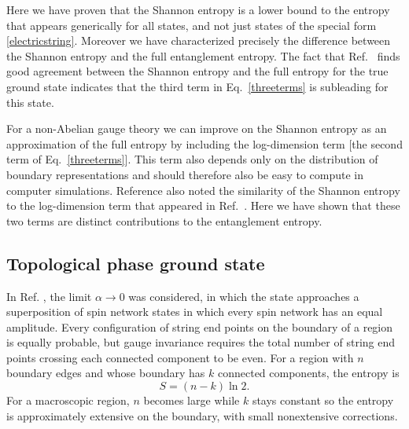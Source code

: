 \documentclass[aps,prd,twocolumn,showpacs,groupedaddress,nofootinbib,letterpaper]{revtex4}
\begin{document}
Here we have proven that the Shannon entropy is a lower bound to the entropy that appears generically for all states, and not just states of the special form \eqref{electricstring}.
Moreover we have characterized precisely the difference between the Shannon entropy and the full entanglement entropy.
The fact that Ref.~\cite{Buividovich2008b} finds good agreement between the Shannon entropy and the full entropy for the true ground state indicates that the third term in Eq.~\eqref{threeterms} is subleading for this state.

For a non-Abelian gauge theory we can improve on the Shannon entropy as an approximation of the full entropy by including the log-dimension term [the second term of Eq.~\eqref{threeterms}].
This term also depends only on the distribution of boundary representations and should therefore also be easy to compute in computer simulations.
Reference \cite{Buividovich2008b} also noted the similarity of the Shannon entropy to the log-dimension term that appeared in Ref.~\cite{Donnelly2008}.
Here we have shown that these two terms are distinct contributions to the entanglement entropy.

\subsection{Topological phase ground state}

In Ref. \cite{Levin2006}, the limit $\alpha \to 0$ was considered, in which the state approaches a superposition of spin network states in which every spin network has an equal amplitude.
Every configuration of string end points on the boundary of a region is equally probable, but gauge invariance requires the total number of string end points crossing each connected component to be even.
For a region with $n$ boundary edges and whose boundary has $k$ connected components, the entropy is
\begin{equation} \label{alphazero}
S = (n - k) \ln 2.
\end{equation}
For a macroscopic region, $n$ becomes large while $k$ stays constant so the entropy is approximately extensive on the boundary, with small nonextensive corrections.
\end{document}
